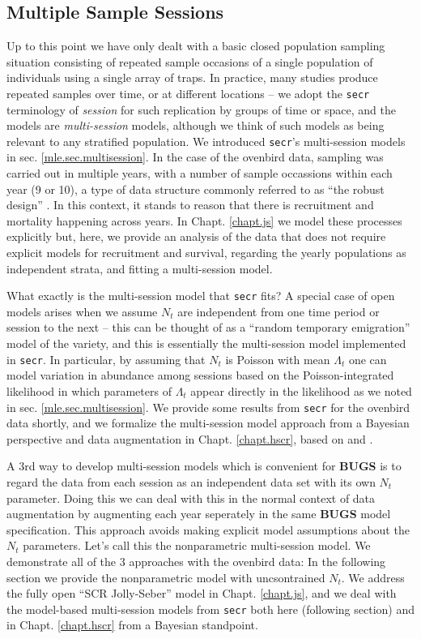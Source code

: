 \subsection{Multiple Sample Sessions}

Up to this point we have only dealt with a basic closed population
sampling situation consisting of repeated sample occasions of a single
population of individuals using a single array of traps. In practice,
many studies produce repeated samples over time, or at different
locations -- we adopt the \mbox{\tt secr} terminology of {\it session}
for such replication by groups of time or space, and the models are
{\it multi-session} models,  although we think of
such
models as being relevant to any stratified population. We introduced
\mbox{\tt secr}'s
multi-session models in sec. \ref{mle.sec.multisession}.
In the case of the ovenbird data, sampling was carried out
in multiple years, with a number of sample occassions within each year
(9 or 10), a type of data structure commonly referred to as ``the
robust design'' \citep{pollock:1982}.
In this context, it stands to reason that there is
recruitment and mortality happening across years. In
Chapt. \ref{chapt.js} we model these processes explicitly but, here,
we provide an analysis of the data that does not require explicit
models for recruitment and survival, regarding the yearly populations
as independent strata, and fitting a multi-session model.

What exactly is the multi-session model that \mbox{\tt secr} fits?
A special case of open models arises when we assume $N_{t}$ are
independent from one time period or session to the next -- this can be
thought of as a ``random temporary emigration'' model of the
\citet{kendall_etal:1997} variety, and this is essentially the
multi-session model implemented in \mbox{\tt secr}.  In particular, by
assuming that $N_{t}$ is Poisson with mean $\Lambda_{t}$ one can model
variation in abundance among sessions based on the Poisson-integrated
likelihood in which parameters of $\Lambda_{t}$ appear directly in the
likelihood as we noted in sec. \ref{mle.sec.multisession}.  We provide
some results from \mbox{\tt secr} for the ovenbird data shortly, and
we formalize the multi-session model approach from a Bayesian
perspective and data augmentation
in Chapt. \ref{chapt.hscr}, based on \citet{converse_royle:2012} and
\citet{converse_royle:2013}.

A 3rd way to develop multi-session models which is convenient for {\bf
  BUGS} is to regard the data from each session as an independent data
set with its own $N_{t}$ parameter. Doing this we can deal with this
in the normal context of data augmentation by augmenting each year
seperately in the same {\bf BUGS} model specification. This approach
avoids making explicit model assumptions about the $N_{t}$
parameters. Let's call this the nonparametric multi-session model.  We
demonstrate all of the 3 approaches with the ovenbird data: In the
following section we provide the nonparametric model with
uncsontrained $N_{t}$. We address the fully open ``SCR Jolly-Seber''
model in Chapt. \ref{chapt.js}, and we deal with the model-based
multi-session models from \mbox{\tt secr} both here (following section) and in
Chapt. \ref{chapt.hscr} from a Bayesian standpoint.


